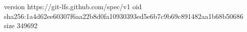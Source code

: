 version https://git-lfs.github.com/spec/v1
oid sha256:1a4d62ee60307f6aa22b8d0fa10930393ed5e6b7c9b69c891482aa1b68b50686
size 349692
